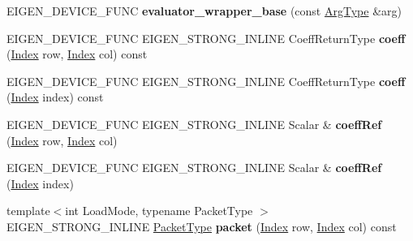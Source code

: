 \begin{DoxyCompactItemize}
E\+I\+G\+E\+N\+\_\+\+D\+E\+V\+I\+C\+E\+\_\+\+F\+U\+NC {\bfseries evaluator\+\_\+wrapper\+\_\+base} (const \hyperlink{group___sparse_core___module}{Arg\+Type} \&arg)
\item 
\mbox{\label{struct_eigen_1_1internal_1_1evaluator__wrapper__base_ae4c999dc0fa9425f31a223fd9528626e}} 
E\+I\+G\+E\+N\+\_\+\+D\+E\+V\+I\+C\+E\+\_\+\+F\+U\+NC E\+I\+G\+E\+N\+\_\+\+S\+T\+R\+O\+N\+G\+\_\+\+I\+N\+L\+I\+NE Coeff\+Return\+Type {\bfseries coeff} (\hyperlink{namespace_eigen_a62e77e0933482dafde8fe197d9a2cfde}{Index} row, \hyperlink{namespace_eigen_a62e77e0933482dafde8fe197d9a2cfde}{Index} col) const
\item 
\mbox{\label{struct_eigen_1_1internal_1_1evaluator__wrapper__base_addbd1d2f5c426bfc7b64ff449d6c23a4}} 
E\+I\+G\+E\+N\+\_\+\+D\+E\+V\+I\+C\+E\+\_\+\+F\+U\+NC E\+I\+G\+E\+N\+\_\+\+S\+T\+R\+O\+N\+G\+\_\+\+I\+N\+L\+I\+NE Coeff\+Return\+Type {\bfseries coeff} (\hyperlink{namespace_eigen_a62e77e0933482dafde8fe197d9a2cfde}{Index} index) const
\item 
\mbox{\label{struct_eigen_1_1internal_1_1evaluator__wrapper__base_ae15e7475c7d4638e8f1229570d468421}} 
E\+I\+G\+E\+N\+\_\+\+D\+E\+V\+I\+C\+E\+\_\+\+F\+U\+NC E\+I\+G\+E\+N\+\_\+\+S\+T\+R\+O\+N\+G\+\_\+\+I\+N\+L\+I\+NE Scalar \& {\bfseries coeff\+Ref} (\hyperlink{namespace_eigen_a62e77e0933482dafde8fe197d9a2cfde}{Index} row, \hyperlink{namespace_eigen_a62e77e0933482dafde8fe197d9a2cfde}{Index} col)
\item 
\mbox{\label{struct_eigen_1_1internal_1_1evaluator__wrapper__base_ad5084d136cbf11ea3b7e085a3de3244e}} 
E\+I\+G\+E\+N\+\_\+\+D\+E\+V\+I\+C\+E\+\_\+\+F\+U\+NC E\+I\+G\+E\+N\+\_\+\+S\+T\+R\+O\+N\+G\+\_\+\+I\+N\+L\+I\+NE Scalar \& {\bfseries coeff\+Ref} (\hyperlink{namespace_eigen_a62e77e0933482dafde8fe197d9a2cfde}{Index} index)
\item 
\mbox{\label{struct_eigen_1_1internal_1_1evaluator__wrapper__base_aa507d02b7eed05b93a9ebfcde14028a7}} 
{\footnotesize template$<$int Load\+Mode, typename Packet\+Type $>$ }\\E\+I\+G\+E\+N\+\_\+\+S\+T\+R\+O\+N\+G\+\_\+\+I\+N\+L\+I\+NE \hyperlink{struct_eigen_1_1_packet_type}{Packet\+Type} {\bfseries packet} (\hyperlink{namespace_eigen_a62e77e0933482dafde8fe197d9a2cfde}{Index} row, \hyperlink{namespace_eigen_a62e77e0933482dafde8fe197d9a2cfde}{Index} col) const

\end{DoxyCompactItemize}
